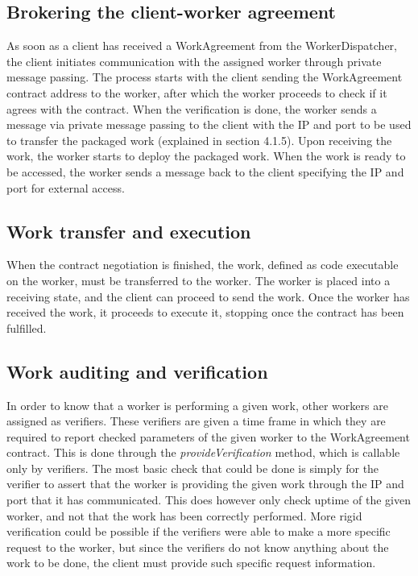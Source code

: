 \subsection{Brokering the client-worker agreement}
\label{sec:res:brokering}
As soon as a client has received a WorkAgreement from the WorkerDispatcher, the client initiates communication with the assigned worker through private message passing. The process starts with the client sending the WorkAgreement contract address to the worker, after which the worker proceeds to check if it agrees with the contract. When the verification is done, the worker sends a message via private message passing to the client with the IP and port to be used to transfer the packaged work (explained in section 4.1.5). Upon receiving the work, the worker starts to deploy the packaged work. When the work is ready to be accessed, the worker sends a message back to the client specifying the IP and port for external access.

\subsection{Work transfer and execution}
When the contract negotiation is finished, the work, defined as code executable on the worker, must be transferred to the worker. The worker is placed into a receiving state, and the client can proceed to send the work. Once the worker has received the work, it proceeds to execute it, stopping once the contract has been fulfilled. 

\subsection{Work auditing and verification}
\label{sec:res:auditing}
In order to know that a worker is performing a given work, other workers are assigned as verifiers. These verifiers are given a time frame in which they are required to report checked parameters of the given worker to the WorkAgreement contract. This is done through the \textit{provideVerification} method, which is callable only by verifiers. The most basic check that could be done is simply for the verifier to assert that the worker is providing the given work through the IP and port that it has communicated. This does however only check uptime of the given worker, and not that the work has been correctly performed. More rigid verification could be possible if the verifiers were able to make a more specific request to the worker, but since the verifiers do not know anything about the work to be done, the client must provide such specific request information.

